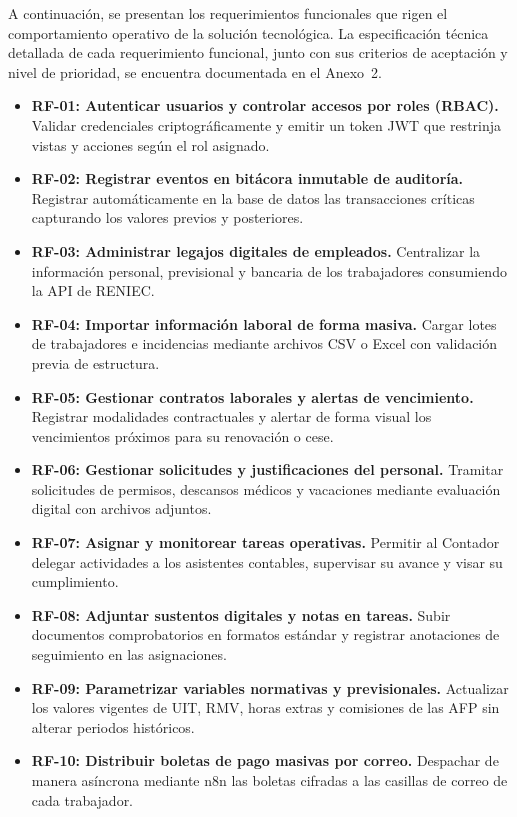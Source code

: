 
A continuación, se presentan los requerimientos funcionales que rigen el comportamiento operativo de la solución tecnológica. 
La especificación técnica detallada de cada requerimiento funcional, junto con sus criterios de aceptación y nivel de prioridad, se encuentra documentada en el Anexo~2.

\begin{itemize}
    \item \textbf{RF-01: Autenticar usuarios y controlar accesos por roles (RBAC).} Validar credenciales criptográficamente y emitir un token JWT que restrinja vistas y acciones según el rol asignado.
    \item \textbf{RF-02: Registrar eventos en bitácora inmutable de auditoría.} Registrar automáticamente en la base de datos las transacciones críticas capturando los valores previos y posteriores.
    \item \textbf{RF-03: Administrar legajos digitales de empleados.} Centralizar la información personal, previsional y bancaria de los trabajadores consumiendo la API de RENIEC.
    \item \textbf{RF-04: Importar información laboral de forma masiva.} Cargar lotes de trabajadores e incidencias mediante archivos CSV o Excel con validación previa de estructura.
    \item \textbf{RF-05: Gestionar contratos laborales y alertas de vencimiento.} Registrar modalidades contractuales y alertar de forma visual los vencimientos próximos para su renovación o cese.
    \item \textbf{RF-06: Gestionar solicitudes y justificaciones del personal.} Tramitar solicitudes de permisos, descansos médicos y vacaciones mediante evaluación digital con archivos adjuntos.
    \item \textbf{RF-07: Asignar y monitorear tareas operativas.} Permitir al Contador delegar actividades a los asistentes contables, supervisar su avance y visar su cumplimiento.
    \item \textbf{RF-08: Adjuntar sustentos digitales y notas en tareas.} Subir documentos comprobatorios en formatos estándar y registrar anotaciones de seguimiento en las asignaciones.
    \item \textbf{RF-09: Parametrizar variables normativas y previsionales.} Actualizar los valores vigentes de UIT, RMV, horas extras y comisiones de las AFP sin alterar periodos históricos.
    \item \textbf{RF-10: Distribuir boletas de pago masivas por correo.} Despachar de manera asíncrona mediante n8n las boletas cifradas a las casillas de correo de cada trabajador.

\end{itemize}
